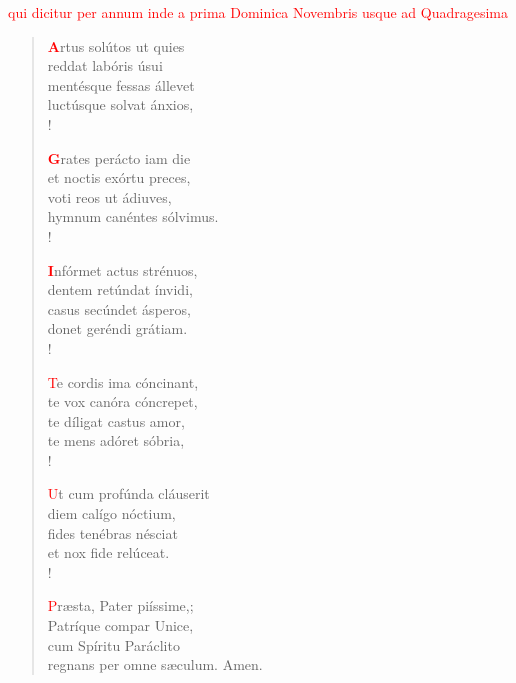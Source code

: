 \noindent\textcolor{red}{qui dicitur per annum inde a prima Dominica Novembris usque ad Quadragesima}\\

\vspace{0.3cm}

\begin{center}
 \begin{verse}
 \textcolor{red}{\bf A}rtus solútos ut quies\\
reddat labóris úsui \\
mentésque fessas állevet\\
luctúsque solvat ánxios,\\!

\textcolor{red}{\bf G}rates perácto iam die\\
et noctis exórtu preces, \\
voti reos ut ádiuves,\\
hymnum canéntes sólvimus.\\!

\textcolor{red}{\bf I}nfórmet actus strénuos, \\
dentem retúndat ínvidi, \\
casus secúndet ásperos,\\
donet geréndi grátiam.\\!

\textcolor{red}{T}e cordis ima cóncinant, \\
te vox canóra cóncrepet, \\
te díligat castus amor,\\
te mens adóret sóbria,\\!

\textcolor{red}{U}t cum profúnda cláuserit \\
diem calígo nóctium, \\
fides tenébras nésciat\\
et nox fide relúceat.\\!

\textcolor{red}{P}ræsta, Pater piíssime,; \\
Patríque compar Unice,\\
cum Spíritu Paráclito\\
regnans per omne sæculum. Amen.\\

\end{verse}     
\end{center}



